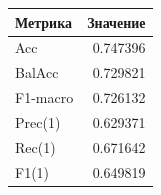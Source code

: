 \begin{tabular}{lr}
\toprule
Метрика & Значение \\
\midrule
Acc & 0.747396 \\
BalAcc & 0.729821 \\
F1-macro & 0.726132 \\
Prec(1) & 0.629371 \\
Rec(1) & 0.671642 \\
F1(1) & 0.649819 \\
\bottomrule
\end{tabular}
